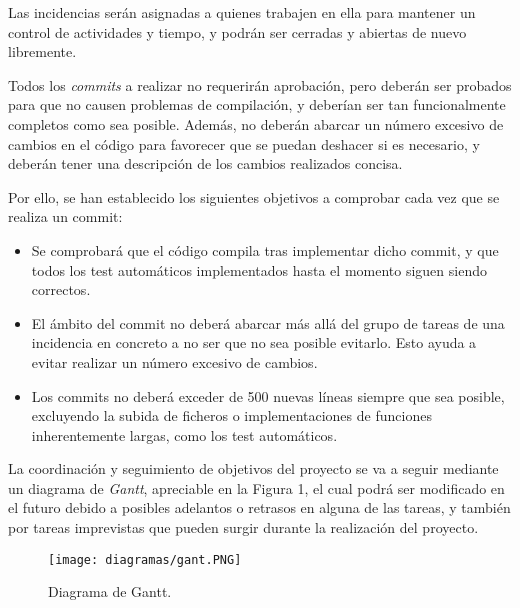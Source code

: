 \documentclass[11pt, a4paper, titlepage]{article}
\begin{document}
    Las incidencias serán asignadas a quienes trabajen en ella para mantener un control de actividades y tiempo, y podrán ser cerradas y abiertas de nuevo libremente.
    
    \item Todos los \textit{commits} a realizar no requerirán aprobación, pero deberán ser probados para que no causen problemas de compilación, y deberían ser tan funcionalmente completos como sea posible. Además, no deberán abarcar un número excesivo de cambios en el código para favorecer que se puedan deshacer si es necesario, y deberán tener una descripción de los cambios realizados concisa. 
    
    Por ello, se han establecido los siguientes objetivos a comprobar cada vez que se realiza un commit:
    \begin{itemize}
        \item Se comprobará que el código compila tras implementar dicho commit, y que todos los test automáticos implementados hasta el momento siguen siendo correctos.
        \item El ámbito del commit no deberá abarcar más allá del grupo de tareas de una incidencia en concreto a no ser que no sea posible evitarlo. Esto ayuda a evitar realizar un número excesivo de cambios.
        \item Los commits no deberá exceder de 500 nuevas líneas siempre que sea posible, excluyendo la subida de ficheros o implementaciones de funciones inherentemente largas, como los test automáticos.
    \end{itemize}



La coordinación y seguimiento de objetivos del proyecto se va a seguir mediante un diagrama de \textit{Gantt}, apreciable en la Figura 1, el cual podrá ser modificado en el futuro debido a posibles adelantos o retrasos en alguna de las tareas, y también por tareas imprevistas que pueden surgir durante la realización del proyecto.\\

\begin{landscape}
    \pagestyle{empty}
    \begin{figure}[!p]
    \centering
    \texttt{[image: diagramas/gant.PNG]}
    \caption{Diagrama de Gantt.}
    \label{fig:my_label}
\end{figure}
\end{landscape}
\end{document}
